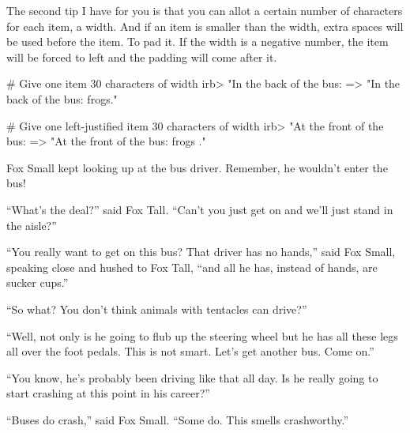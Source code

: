 \documentclass[12pt,twoside]{report}
\begin{document}
The second tip I have for you is that you can allot a certain number
of characters for each item, a width.  And if an item is smaller than
the width, extra spaces will be used before the item.  To pad it. If
the width is a negative number, the item will be forced to left and
the padding will come after it.


\begin{consolecode}

 # Give one item 30 characters of width
 irb> "In the back of the bus: %
   => "In the back of the bus:                          frogs."

 # Give one left-justified item 30 characters of width
 irb> "At the front of the bus: %
   => "At the front of the bus: frogs                         ."

\end{consolecode}


Fox Small kept looking up at the bus driver.  Remember, he wouldn't
enter the bus!

``What's the deal?'' said Fox Tall.  ``Can't you just get on and we'll
just stand in the aisle?''

``You really want to get on this bus?  That driver has no hands,''
said Fox Small, speaking close and hushed to Fox Tall, ``and all he
has, instead of hands, are sucker cups.''  

``So what?  You don't think
animals with tentacles can drive?''

``Well, not only is he going to flub up the steering wheel but he has
all these legs all over the foot pedals.  This is not smart.  Let's
get another bus.  Come on.''

``You know, he's probably been driving like that all day.  Is he
really going to start crashing at this point in his career?''

``Buses do crash,'' said Fox Small.  ``Some do.  This smells
crashworthy.''
\end{document}
